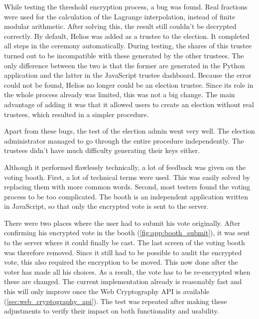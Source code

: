 \par While testing the threshold encryption process, a bug was found. Real fractions were used for the calculation of the Lagrange interpolation, instead of finite modular arithmetic. After solving this, the result still couldn't be decrypted correctly. By default, Helios was added as a trustee to the election. It completed all steps in the ceremony automatically. During testing, the shares of this trustee turned out to be incompatible with these generated by the other trustees. The only difference between the two is that the former are generated in the Python application and the latter in the JavaScript trustee dashboard. Because the error could not be found, Helios no longer could be an election trustee. Since its role in the whole process already was limited, this was not a big change. The main advantage of adding it was that it allowed users to create an election without real trustees, which resulted in a simpler procedure.

\par Apart from these bugs, the test of the election admin went very well. The election administrator managed to go through the entire procedure independently. The trustees didn't have much difficulty generating their keys either.

\par Although it performed flawlessly technically, a lot of feedback was given on the voting booth. First, a lot of technical terms were used. This was easily solved by replacing them with more common words. Second, most testers found the voting process to be too complicated. The booth is an independent application written in JavaScript, so that only the encrypted vote is sent to the server.

\par There were two places where the user had to submit his vote originally. After confirming his encrypted vote in the booth (\ref{fig:app:booth_submit}), it was sent to the server where it could finally be cast. The last screen of the voting booth was therefore removed. Since it still had to be possible to audit the encrypted vote, this also required the encryption to be moved. This now done after the voter has made all his choices. As a result, the vote has to be re-encrypted when these are changed. The current implementation already is reasonably fast and this will only improve once the Web Cryptography API is available (\ref{sec:web_cryptography_api}). The test was repeated after making these adjustments to verify their impact on both functionality and usability.

